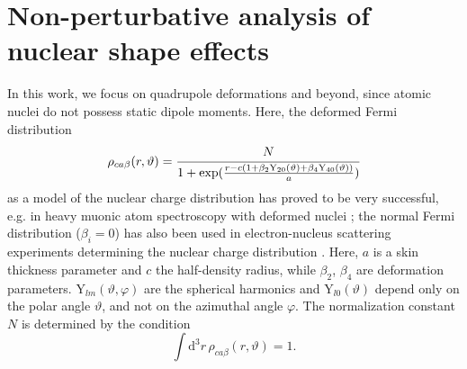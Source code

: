 \section{Non-perturbative analysis of nuclear shape effects}
In this work, we focus on quadrupole deformations and beyond, since atomic nuclei do not possess static dipole moments. Here, the deformed Fermi distribution
\begin{equation}
\rho_{ca\beta}(r,\vartheta)=\cfrac{N}{1+\text{exp}(\frac{r-c(1+\beta_2 \text{Y}_{20}(\vartheta)+\beta_4 \text{Y}_{40}(\vartheta))}{a})}
\label{eq:deffermi}
\end{equation}
as a model of the nuclear charge distribution has proved to be very successful, e.g. in heavy muonic atom spectroscopy with deformed nuclei \cite{hitlin1970,tanaka1984}; the normal Fermi distribution (${\beta_i}{=}{0}$) has also been used in electron-nucleus scattering experiments determining the nuclear charge distribution \cite{hahn1956}. Here, $a$ is a skin thickness parameter and $c$ the half-density radius, while $\beta_2$, $\beta_4$ are deformation parameters. $\text{Y}_{lm}(\vartheta,\varphi)$ are the spherical harmonics and $\text{Y}_{l0}(\vartheta)$ depend only on the polar angle $\vartheta$, and not on the azimuthal angle $\varphi$. The normalization constant $N$ is determined by the condition
\begin{equation}
\int \text{d}^3r\, \rho_{ca\beta}(r,\vartheta)=1.
\end{equation}
%
